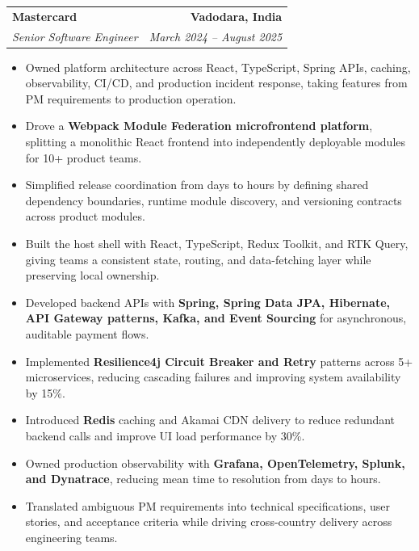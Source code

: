 \documentclass[letterpaper,11pt]{article}
\makeatletter
\newcommand{\resumeItem}[1]{\item\small{{#1 \vspace{-3pt}}}}
\newcommand{\resumeSubheading}[4]{
  \vspace{-3pt}\item
    \begin{tabular*}{1.0\textwidth}[t]{l@{\extracolsep{\fill}}r}
      \textbf{#1} & \textbf{\small #2} \\
      \textit{\small#3} & \textit{\small #4} \\
    \end{tabular*}\vspace{-4pt}
}
\newcommand{\resumeItemListStart}{\begin{itemize}}
\newcommand{\resumeItemListEnd}{\end{itemize}\vspace{0pt}}
\makeatother
\begin{document}
    \resumeSubheading
      {Mastercard}{Vadodara, India}
      {Senior Software Engineer}{March 2024 -- August 2025}
      \resumeItemListStart
        \resumeItem{Owned platform architecture across React, TypeScript, Spring APIs, caching, observability, CI/CD, and production incident response, taking features from PM requirements to production operation.}
        \resumeItem{Drove a \textbf{Webpack Module Federation microfrontend platform}, splitting a monolithic React frontend into independently deployable modules for 10+ product teams.}
        \resumeItem{Simplified release coordination from days to hours by defining shared dependency boundaries, runtime module discovery, and versioning contracts across product modules.}
        \resumeItem{Built the host shell with React, TypeScript, Redux Toolkit, and RTK Query, giving teams a consistent state, routing, and data-fetching layer while preserving local ownership.}
        \resumeItem{Developed backend APIs with \textbf{Spring, Spring Data JPA, Hibernate, API Gateway patterns, Kafka, and Event Sourcing} for asynchronous, auditable payment flows.}
        \resumeItem{Implemented \textbf{Resilience4j Circuit Breaker and Retry} patterns across 5+ microservices, reducing cascading failures and improving system availability by 15\%.}
        \resumeItem{Introduced \textbf{Redis} caching and Akamai CDN delivery to reduce redundant backend calls and improve UI load performance by 30\%.}
        \resumeItem{Owned production observability with \textbf{Grafana, OpenTelemetry, Splunk, and Dynatrace}, reducing mean time to resolution from days to hours.}
        \resumeItem{Translated ambiguous PM requirements into technical specifications, user stories, and acceptance criteria while driving cross-country delivery across engineering teams.}
      \resumeItemListEnd
\end{document}
